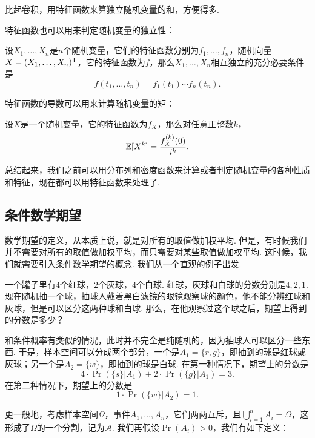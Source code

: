 比起卷积，用特征函数来算独立随机变量的和，方便得多. 

特征函数也可以用来判定随机变量的独立性：

\begin{proposition}\label{prop:characteristic-function-independence}
设$X_1,\dots,X_n$是$n$个随机变量，它们的特征函数分别为$f_1,\dots,f_n$，随机向量$X=(X_1,\dots,X_n)^{\mathsf{T}}$，它的特征函数为$f$，那么$X_1,\dots,X_n$相互独立的充分必要条件是
\[f(t_1,\dots,t_n)=f_1(t_1)\cdots f_n(t_n).\]
\end{proposition}

特征函数的导数可以用来计算随机变量的矩：

\begin{proposition}\label{prop:characteristic-function-moment}
设$X$是一个随机变量，它的特征函数为$f_X$，那么对任意正整数$k$，
\[\mathbb{E}[X^k]=\frac{f_X^{(k)}(0)}{i^k}.\]
\end{proposition}

总结起来，我们之前可以用分布列和密度函数来计算或者判定随机变量的各种性质和特征，现在都可以用特征函数来处理了. 

\subsection{条件数学期望}\label{subsec:conditional-expectation}

数学期望的定义，从本质上说，就是对所有的取值做加权平均. 但是，有时候我们并不需要对所有的取值做加权平均，而只需要对某些取值做加权平均. 这时候，我们就需要引入条件数学期望的概念. 我们从一个直观的例子出发. 

\begin{example}
一个罐子里有$4$个红球，$2$个灰球，$4$个白球. 红球，灰球和白球的分数分别是$4,2,1$. 现在随机抽一个球，抽球人戴着黑白滤镜的眼镜观察球的颜色，他不能分辨红球和灰球，但是可以区分这两种球和白球. 那么，在他观察过这个球之后，期望上得到的分数是多少？

和条件概率有类似的情况，此时并不完全是纯随机的，因为抽球人可以区分一些东西. 于是，样本空间可以分成两个部分，一个是$A_1=\{r,g\}$，即抽到的球是红球或灰球；另一个是$A_2=\{w\}$，即抽到的球是白球. 在第一种情况下，期望上的分数是
\[4\cdot\Pr(\{s\}|A_1)+2\cdot\Pr(\{g\}|A_1)=3.\]
在第二种情况下，期望上的分数是
\[1\cdot\Pr(\{w\}|A_2)=1.\]
\end{example}

更一般地，考虑样本空间$\Omega$，事件$A_1,\dots,A_n$，它们两两互斥，且$\bigcup_{i=1}^n A_i=\Omega$，这形成了$\Omega$的一个分割，记为$\mathscr{A}$. 我们再假设$\Pr(A_i)>0$，我们有如下定义：

